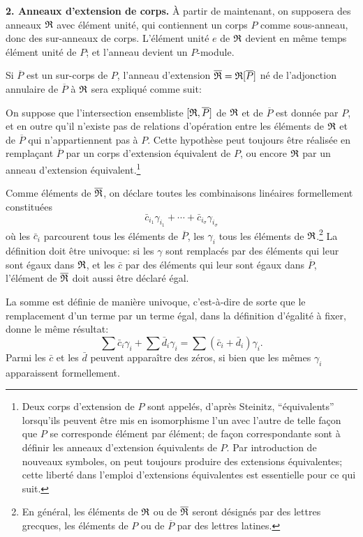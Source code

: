\textbf{2. Anneaux d'extension de corps.} À partir de maintenant, on supposera des anneaux $\mathfrak R$ avec élément unité, qui contiennent un corps $P$ comme sous-anneau, donc des sur-anneaux de corps. L'élément unité $e$ de $\mathfrak R$ devient en même temps élément unité de $P$; et l'anneau devient un $P$-module.

Si $\overline P$ est un sur-corps de $P$, l'anneau d'extension $\overline{\mathfrak R}=\mathfrak R[\overline P]$ né de l'adjonction annulaire de $\overline P$ à $\mathfrak R$ sera expliqué comme suit:

On suppose que l'intersection ensembliste $[\mathfrak R,\overline P]$ de $\mathfrak R$ et de $\overline P$ est donnée par $P$, et en outre qu'il n'existe pas de relations d'opération entre les éléments de $\mathfrak R$ et de $\overline P$ qui n'appartiennent pas à $P$. Cette hypothèse peut toujours être réalisée en remplaçant $\overline P$ par un corps d'extension équivalent de $P$, ou encore $\mathfrak R$ par un anneau d'extension équivalent.\footnote{Deux corps d'extension de $P$ sont appelés, d'après Steinitz, ``équivalents'' lorsqu'ils peuvent être mis en isomorphisme l'un avec l'autre de telle façon que $P$ se corresponde élément par élément; de façon correspondante sont à définir les anneaux d'extension équivalents de $P$. Par introduction de nouveaux symboles, on peut toujours produire des extensions équivalentes; cette liberté dans l'emploi d'extensions équivalentes est essentielle pour ce qui suit.}

Comme éléments de $\overline{\mathfrak R}$, on déclare toutes les combinaisons linéaires formellement constituées
\[
   \bar c_{i_1}\gamma_{i_1}+\cdots+\bar c_{i_\sigma}\gamma_{i_\sigma}
\]
où les $\bar c_i$ parcourent tous les éléments de $\overline P$, les $\gamma_i$ tous les éléments de $\mathfrak R$.\footnote{En général, les éléments de $\mathfrak R$ ou de $\overline{\mathfrak R}$ seront désignés par des lettres grecques, les éléments de $P$ ou de $\overline P$ par des lettres latines.} La définition doit être univoque: si les $\gamma$ sont remplacés par des éléments qui leur sont égaux dans $\mathfrak R$, et les $\bar c$ par des éléments qui leur sont égaux dans $\overline P$, l'élément de $\overline{\mathfrak R}$ doit aussi être déclaré égal.

La somme est définie de manière univoque, c'est-à-dire de sorte que le remplacement d'un terme par un terme égal, dans la définition d'égalité à fixer, donne le même résultat:
\[
   \sum \bar c_i\gamma_i+\sum \bar d_i\gamma_i
   =\sum(\bar c_i+\bar d_i)\gamma_i .
\]
Parmi les $\bar c$ et les $\bar d$ peuvent apparaître des zéros, si bien que les mêmes $\gamma_i$ apparaissent formellement.

